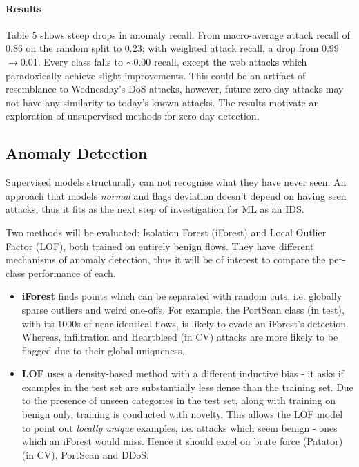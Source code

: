 \documentclass{article}
\begin{document}
\paragraph{Results} Table 5 shows steep drops in anomaly recall. From macro-average attack recall of 0.86 on the random split to 0.23; with weighted attack recall, a drop from 0.99$\to$0.01. Every class falls to $\sim$0.00 recall, except the web attacks which paradoxically achieve slight improvements. This could be an artifact of resemblance to Wednesday's DoS attacks, however, future zero-day attacks may not have any similarity to today's known attacks. The results motivate an exploration of unsupervised methods for zero-day detection.
\subsection{Anomaly Detection}
Supervised models structurally can not recognise what they have never seen. An approach that models \textit{normal} and flags deviation doesn't depend on having seen attacks, thus it fits as the next step of investigation for ML as an IDS.
\par Two methods will be evaluated: Isolation Forest (iForest) and Local Outlier Factor (LOF), both trained on entirely benign flows. They have different mechanisms of anomaly detection, thus it will be of interest to compare the per-class performance of each.
\begin{itemize}
\item \textbf{iForest} finds points which can be separated with random cuts, i.e. globally sparse outliers and weird one-offs. For example, the PortScan class (in test), with its 1000s of near-identical flows, is likely to evade an iForest's detection. Whereas, infiltration and Heartbleed (in CV) attacks are more likely to be flagged due to their global uniqueness. 
\item \textbf{LOF} uses a density-based method with a different inductive bias - it asks if examples in the test set are substantially less dense than the training set. Due to the presence of unseen categories in the test set, along with training on benign only, training is conducted with novelty. This allows the LOF model to point out \textit{locally unique} examples, i.e. attacks which seem benign - ones which an iForest would miss. Hence it should excel on  brute force (Patator) (in CV), PortScan and DDoS.
\end{itemize}
\end{document}
